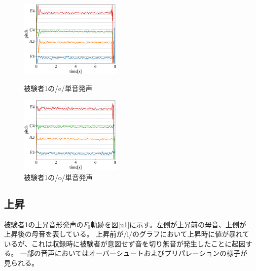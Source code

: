 \documentclass[10.5ptj,a4j,dvipdfmx,uplatex, oneside, openany, report]{jsbook}%
\begin{document}
\begin{figure}[thbp]
    \begin{minipage}{0.33\hsize}
        \begin{center}
            \includegraphics[width=5cm]{long/long_1_e.png}
            \caption{被験者1の/e/単音発声}
            \label{le}
        \end{center}
    \end{minipage}
    \begin{minipage}{0.33\hsize}
        \begin{center}
            \includegraphics[width=5cm]{long/long_1_o.png}
            \caption{被験者1の/o/単音発声}
            \label{lo}
        \end{center}
    \end{minipage}
    \begin{minipage}{0.33\hsize} 
    \end{minipage}
    
\end{figure}

\subsection{上昇}
被験者1の上昇音形発声の$F_0$軌跡を図\ref{u1}に示す。左側が上昇前の母音、上側が上昇後の母音を表している。
上昇前が/i/のグラフにおいて上昇時に値が暴れているが、これは収録時に被験者が意図せず音を切り無音が発生したことに起因する。
一部の音声においてはオーバーシュートおよびプリパレーションの様子が見られる。
\end{document}
